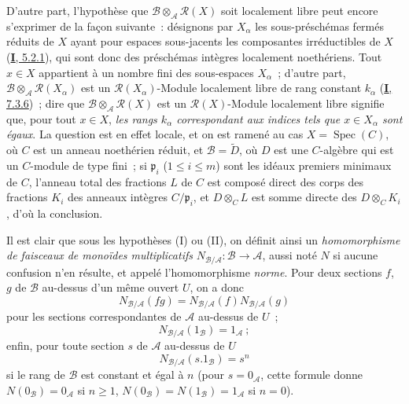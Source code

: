\begin{env}[6.5.1]
D'autre part, l'hypothèse que
$\mathcal{B}\otimes_{\mathcal{A}}\mathcal{R}(X)$ soit localement libre peut
encore s'exprimer de la façon suivante~: désignons par $X_\alpha$ les
sous-préschémas fermés réduits de $X$ ayant pour espaces sous-jacents les
composantes irréductibles de $X$ (\hyperref[I.5.2.1-fr]{\textbf{I}, 5.2.1}), qui sont
donc des préschémas intègres localement noethériens. Tout $x\in X$ appartient
à un nombre fini des sous-espaces $X_\alpha$~; d'autre part,
$\mathcal{B}\otimes_{\mathcal{A}}\mathcal{R}(X_\alpha)$ est un
$\mathcal{R}(X_\alpha)$-Module localement libre de rang constant $k_\alpha$
(\hyperref[I.7.3.6-fr]{\textbf{I}, 7.3.6})~; dire que
$\mathcal{B}\otimes_{\mathcal{A}}\mathcal{R}(X)$ est un
$\mathcal{R}(X)$-Module localement libre signifie que, pour tout $x\in X$,
\emph{les rangs $k_\alpha$ correspondant aux indices tels que $x\in X_\alpha$
sont égaux}. La question est en effet locale, et on est ramené au cas
$X=\operatorname{Spec}(C)$, où $C$ est un anneau noethérien réduit, et
$\mathcal{B}=\widetilde{D}$, où $D$ est une $C$-algèbre qui est un $C$-module
de type fini~; si $\mathfrak{p}_i$ ($1\leq i\leq m$) sont les idéaux premiers
minimaux de $C$, l'anneau total des fractions $L$ de $C$ est composé direct
des corps des fractions $K_i$ des anneaux intègres $C/\mathfrak{p}_i$, et
$D\otimes_C L$ est somme directe des $D\otimes_C K_i$, d'où la conclusion.

Il est clair que sous les hypothèses (I) ou (II), on définit ainsi un
\emph{homomorphisme de faisceaux de monoïdes multiplicatifs}
$N_{\mathcal{B}/\mathcal{A}}:\mathcal{B}\to\mathcal{A}$, aussi noté $N$ si
aucune confusion n'en résulte, et appelé l'homomorphisme \emph{norme}. Pour
deux sections $f$, $g$ de $\mathcal{B}$ au-dessus d'un même ouvert $U$, on a
donc
\[
\label{II.6.5.1.1-fr}
N_{\mathcal{B}/\mathcal{A}}(fg)
=N_{\mathcal{B}/\mathcal{A}}(f)N_{\mathcal{B}/\mathcal{A}}(g)
\tag{6.5.1.1}
\]
pour les sections correspondantes de $\mathcal{A}$ au-dessus de $U$~;
\[
\label{II.6.5.1.2-fr}
N_{\mathcal{B}/\mathcal{A}}(1_{\mathcal{B}})=1_{\mathcal{A}}~;
\tag{6.5.1.2}
\]
enfin, pour toute section $s$ de $\mathcal{A}$ au-dessus de $U$
\[
\label{II.6.5.1.3-fr}
N_{\mathcal{B}/\mathcal{A}}(s.1_{\mathcal{B}})=s^n
\tag{6.5.1.3}
\]
si le rang de $\mathcal{B}$ est constant et égal à $n$ (pour
$s=0_{\mathcal{A}}$, cette formule donne
$N(0_{\mathcal{B}})=0_{\mathcal{A}}$ si $n\geq1$,
$N(0_{\mathcal{B}})=N(1_{\mathcal{B}})=1_{\mathcal{A}}$ si $n=0$).


\end{env}
